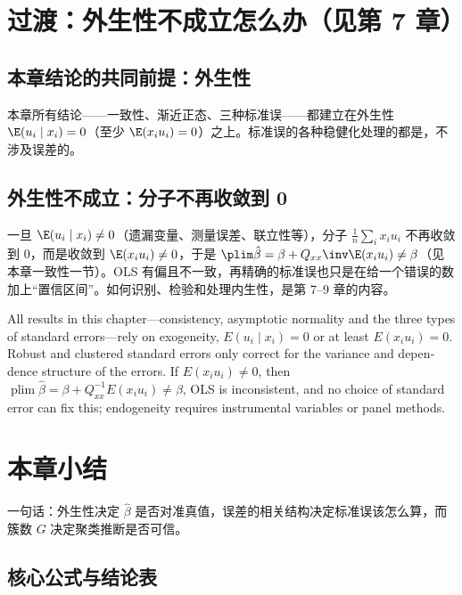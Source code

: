 \section{过渡：外生性不成立怎么办（见第 7 章）}\label{sec:U05b-bridge}

\subsection{本章结论的共同前提：外生性}

本章所有结论——一致性、渐近正态、三种标准误——都建立在外生性 $\E(u_i\mid x_i)=0$（至少 $\E(x_iu_i)=0$）之上。标准误的各种稳健化处理的都是，不涉及误差的。

\subsection{外生性不成立：分子不再收敛到 0}

一旦 $\E(u_i\mid x_i)\ne0$（遗漏变量、测量误差、联立性等），分子 $\frac1n\sum_ix_iu_i$ 不再收敛到 0，而是收敛到 $\E(x_iu_i)\ne0$，于是 $\plim\hat\beta=\beta+Q_{xx}\inv\E(x_iu_i)\ne\beta$（见本章一致性一节）。OLS 有偏且不一致，再精确的标准误也只是在给一个错误的数加上“置信区间”。如何识别、检验和处理内生性，是第 7--9 章的内容。

\begin{english}
All results in this chapter---consistency, asymptotic normality and the three types of standard errors---rely on exogeneity, $E(u_i\mid x_i)=0$ or at least $E(x_iu_i)=0$. Robust and clustered standard errors only correct for the variance and dependence structure of the errors. If $E(x_iu_i)\neq0$, then $\operatorname{plim}\hat\beta=\beta+Q_{xx}^{-1}E(x_iu_i)\neq\beta$, OLS is inconsistent, and no choice of standard error can fix this; endogeneity requires instrumental variables or panel methods.
\end{english}

\section{本章小结}\label{sec:U05b-summary}

一句话：外生性决定 $\hat\beta$ 是否对准真值，误差的相关结构决定标准误该怎么算，而簇数 $G$ 决定聚类推断是否可信。

\subsection{核心公式与结论表}

